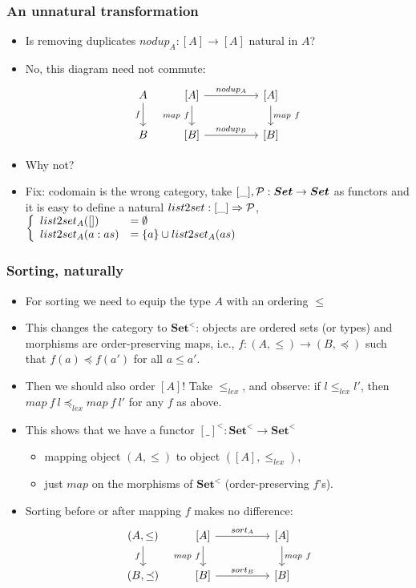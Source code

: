 \documentclass[handout]{beamer}
\newcommand{\To}{\Rightarrow}
\newcommand{\bfsf}[1]{{\boldsymbol{#1}}}
\newcommand{\Set}{\bfsf{Set}}
\begin{document}
\frame
  {   
    \frametitle{An unnatural transformation}\label{Ch3:unnat}

 \begin{itemize}[<+->]
\item Is removing duplicates $nodup_A : [A] \to [A]$ natural in $A$?
\item No, this diagram need not commute:
\[
\begin{tikzcd}[ampersand replacement=\&]
A \arrow[swap]{d}{f} \& {[A]}  \arrow[swap]{d}{map~f}\arrow{rr}{nodup_A} \&\& {[A]}\arrow{d}{map~f}\\
B \& {[B]}  \arrow{rr}{nodup_B}\& \& {[B]}
\end{tikzcd}
\]
\item Why not?
\item Fix: codomain is the wrong category, take $[\_],\powset : \Set\to\Set$ as functors
and it is easy to define a natural $list2set : [\_]\To\powset$,
$\left\{\begin{array}{ll}list2set_A([]) &= \emptyset\\list2set_A(a:as) &=\{a\}\cup list2set_A(as)
\end{array}\right.$
 \end{itemize}

 }

\frame
  {   
    \frametitle{Sorting, naturally}\label{Ch3:sorting}

 \begin{itemize}[<+->]
\item For sorting we need to equip the type $A$ with an ordering $\leq$
\item This changes the category to $\Set^{<}$: objects are ordered sets (or types) and
morphisms are order-preserving maps, i.e., $f: (A,\leq)\to (B,\preceq)$ 
such that $f(a)\preceq f(a')$ for all $a\leq a'$. 
\item Then we should also order $[A]$! Take $\leq_{lex}$, and observe:
if $l \leq_{lex} l'$, then $map~f~l \preceq_{lex} map~f~l'$ for any $f$ as above.
\item This shows that we have a functor $[\_]^{<} : \Set^{<} \to \Set^{<}$
   \begin{itemize}[<+->]
\item mapping object $(A,\leq)$ to object $([A],\leq_{lex})$, 
\item just $map$ on the morphisms of $\Set^{<}$ (order-preserving $f$'s).
   \end{itemize}
\item Sorting before or after mapping $f$ makes no difference:
\[
\begin{tikzcd}[ampersand replacement=\&]
(A,\leq) \arrow[swap]{d}{f} \& {[A]}  \arrow[swap]{d}{map~f}\arrow{rr}{sort_A} \&\& {[A]}\arrow{d}{map~f}\\
(B,\preceq) \& {[B]}  \arrow{rr}{sort_B}\& \& {[B]}
\end{tikzcd}
\]
 \end{itemize}

 }
\end{document}
